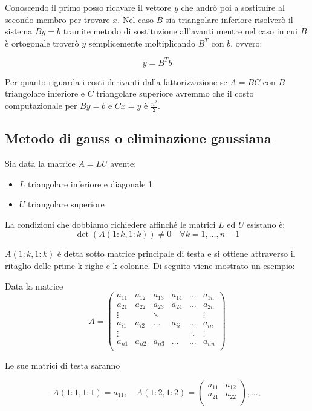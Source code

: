 \documentclass[12pt, a4paper]{book}
\theoremstyle{definition}
\begin{document}
\begin{flushleft}
Conoscendo il primo posso ricavare il vettore $y$ che andrò poi a sostituire al secondo membro per trovare $x$.  Nel caso $B$ sia triangolare inferiore risolverò il sistema $By = b$ tramite metodo di sostituzione all'avanti mentre nel caso in cui $B$ è ortogonale troverò $y$ semplicemente moltiplicando $B^{T}$ con $b$, ovvero:

 \[ 
		y = B^{T}b
\]

Per quanto riguarda i costi derivanti dalla fattorizzazione se $A = BC$ con $B$ triangolare inferiore e $C$ triangolare superiore avremmo che il costo computazionale per $By = b$ e  $Cx = y$ è $\frac{n^{2}}{2}$.
\end{flushleft}

\subsection{Metodo di gauss o eliminazione gaussiana}
\begin{flushleft}

Sia data la matrice $A = LU$  avente: 

\begin{itemize}
	\item $L$ triangolare inferiore e diagonale 1 
	\item $U$ triangolare superiore
\end{itemize}

La condizioni che dobbiamo richiedere affinché le matrici $L$ ed $U$ esistano è:
\[
	\det(A(1:k, 1:k)) \neq 0 \quad \forall k = 1, \dots, n-1
\]

$A(1:k, 1:k)$ è detta sotto matrice principale di testa e si ottiene attraverso il ritaglio delle prime k righe e k colonne. Di seguito viene mostrato un esempio: 

Data la matrice 
\[
	A = 
	\begin{pmatrix}
		a_{11} & a_{12} & a_{13} & a_{14} & \dots & a_{1n} \\
		a_{21} & a_{22} & a_{23} & a_{24} & \dots & a_{2n} \\
		\vdots & & \ddots &  & & \vdots \\
		a_{i1} & a_{i2} & \dots & a_{ii} & \dots & a_{in} \\
		\vdots & & & & \ddots &   \vdots \\
		a_{n1} & a_{n2} & a_{n3} & \dots &  \dots & a_{nn} \\
	\end{pmatrix}
\]

Le sue matrici di testa saranno

\[ 
	A(1:1, 1:1) = a_{11},
	\quad
	A(1:2, 1:2) = 
	\begin{pmatrix}
		a_{11} & a_{12} \\
		a_{21} & a_{22} \\
	\end{pmatrix},
	\dots
	,
\]



\end{flushleft}
\end{document}
